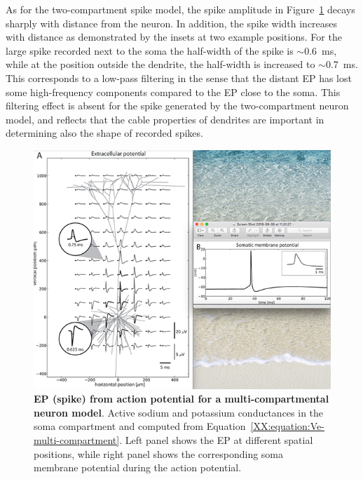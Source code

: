 As for the two-compartment spike model, the spike amplitude in Figure~\ref{Spikes:fig:MultiCompartment} 
decays sharply with distance from the neuron. In addition, the spike width increases
with distance as demonstrated by the insets at two example positions. For the large spike recorded next to
the soma the half-width of the spike is $\sim$0.6~ms, while at the position outside the dendrite, the half-width is increased to
$\sim$0.7~ms. This corresponds to a low-pass filtering in the sense that the distant EP has lost some 
high-frequency components compared to the EP close to the soma. This filtering effect is absent for the spike generated by the 
two-compartment neuron model, and reflects that the cable properties of dendrites are important in determining 
also the shape of recorded spikes.   

\begin{figure}[!ht]
\begin{center}
\includegraphics{Figures/Spikes/Spikes-MultiCompartment-w100-r150}
\end{center}
\caption[]{\textbf{EP (spike) from action potential for a multi-compartmental neuron model}. Active sodium
and potassium conductances in the soma compartment and computed from 
Equation~\ref{XX:equation:Ve-multi-compartment}.
Left panel shows the EP at different spatial positions, while right panel shows the corresponding
soma membrane potential during the action potential. 
}
\label{Spikes:fig:MultiCompartment}
\end{figure}

